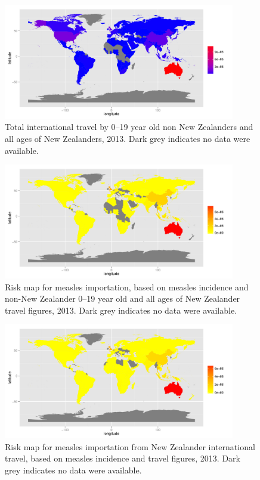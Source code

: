 \documentclass{article}
\begin{document}
\begin{figure}
\begin{center}
     \includegraphics[width=0.9\textwidth]{2013totnp1.pdf}
\end{center}
\caption{Total international travel by 0--19 year old non New Zealanders and all ages of New Zealanders, 2013. Dark grey indicates no data were available.}
\label{fig:travel12}
\end{figure}

\begin{figure}
\begin{center}
     \includegraphics[width=0.9\textwidth]{2013totnp4.pdf}
\end{center}
\caption{Risk map for measles importation, based on measles incidence and non-New Zealander 0--19 year old and all ages of New Zealander travel figures, 2013. Dark grey indicates no data were available.}
\label{fig:risk12}
\end{figure}

\begin{figure}
\begin{center}
     \includegraphics[width=0.9\textwidth]{2013nznp4.pdf}
\end{center}
\caption{Risk map for measles importation from New Zealander international travel, based on measles incidence and travel figures, 2013. Dark grey indicates no data were available.}
\label{fig:nzrisk12}
\end{figure}
\end{document}

